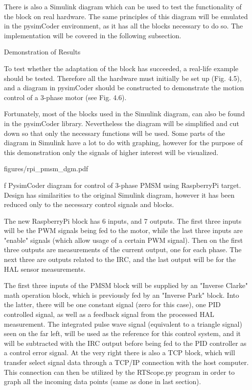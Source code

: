 \quad There is also a Simulink diagram which can be used to test the functionality
of the block on real hardware. The same principles of this diagram will be emulated in the
pysimCoder environment, as it has all the blocks necessary to do so. The implementation will
be covered in the following subsection. 


\secc Demonstration of Results

\qquad To test whether the adaptation of the block has succeeded, a real-life example should be
tested. Therefore all the hardware must initially be set up (Fig. 4.5), and a diagram in pysimCoder
should be constructed to demonstrate the motion control of a 3-phase motor (see Fig. 4.6). 

\quad Fortunately, most of the blocks used in the Simulink diagram, can also be found
in the pysimCoder library. Nevertheless the diagram will be simplified and cut down so that only
the necessary functions will be used. Some parts of the diagram in Simulink have a lot to do with
graphing, however for the purpose of this demonstration only the signals of higher interest will
be visualized.


\midinsert {}
\picw=15cm \cinspic figures/rpi_pmsm_dgm.pdf
\caption/f PysimCoder diagram for control of 3-phase PMSM using RaspberryPi target. Design has
similarities to the original Simulink diagram, however it has been reduced only to the necessary
control signals and blocks.
\endinsert

\quad The new RaspberryPi block has 6 inputs, and 7 outputs. The first three inputs will be the
PWM signals being fed to the motor, while the last three inputs are "enable" signals (which allow
usage of a certain PWM signal). Then on the first three outputs are measurements of the current
output, one for each phase. The next three are outputs related to the IRC, and the last output
will be for the HAL sensor measurements. 

\quad The first three inputs of the PMSM block will be supplied by an "Inverse Clarke" math
operation block, which is previously fed by an "Inverse Park" block. Into the latter, there will
be one constant signal (zero for this case), one PID controlled signal, as well as a feedback signal
from the processed HAL measurement. The integrated pulse wave signal (equivalent to a triangle signal)
seen on the far left, will be used as the reference for this control system, and it will be subtracted
with the IRC output before being fed to the PID controller as a control error signal. At the very right
there is also a TCP block, which will transfer select signal data through a TCP/IP connection with the
host computer. This connection can then be utilized by the RTScope.py program in order to graph all the
incoming data points (same as done in last section).

